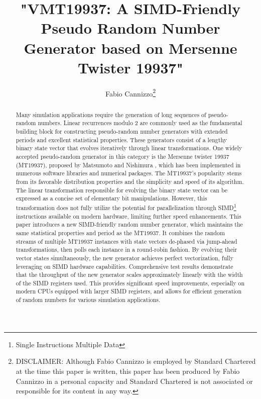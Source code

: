\documentclass[preprint,1p,times]{elsarticle}
\begin{document}

\newcommand\XOR{\mathbin{\oplus}}
\newcommand\OR{\mid}
\newcommand\AND{\&}
\newcommand\myceil[1]{\left\lceil{#1}\right\rceil}



\begin{frontmatter}
\title{"VMT19937: A SIMD-Friendly Pseudo Random Number Generator based on Mersenne Twister 19937"}

\author{\renewcommand*{\thefootnote}{\fnsymbol{footnote}}
	Fabio Cannizzo\footnote{DISCLAIMER: Although Fabio Cannizzo is employed by Standard Chartered at the time this paper is written, this paper has been produced by Fabio Cannizzo in a personal capacity and Standard Chartered is not associated or responsible for its content in any way.}}

\begin{abstract}
Many simulation applications require the generation of long sequences of pseudo-random numbers. Linear recurrences modulo 2 are commonly used as the fundamental building block for constructing pseudo-random number generators with extended periods and excellent statistical properties. These generators consist of a lengthy binary state vector that evolves iteratively through linear transformations. One widely accepted pseudo-random generator in this category is the Mersenne twister 19937 (MT19937), proposed by Matsumoto and Nishimura \cite{mt19937}, which has been implemented in numerous software libraries and numerical packages. The MT19937's popularity stems from its favorable distribution properties and the simplicity and speed of its algorithm. The linear transformation responsible for evolving the binary state vector can be expressed as a concise set of elementary bit manipulations. However, this transformation does not fully utilize the potential for parallelization through SIMD\footnote{Single Instructions Multiple Data} instructions available on modern hardware, limiting further speed enhancements.
This paper introduces a new SIMD-friendly random number generator, which maintains the same statistical properties and period as the MT19937. It combines the random streams of multiple MT19937 instances with state vectors de-phased via jump-ahead transformations, then polls each instance in a round-robin fashion. By evolving their vector states simultaneously, the new generator achieves perfect vectorization, fully leveraging on SIMD hardware capabilities. Comprehensive test results demonstrate that the throughput of the new generator scales approximately linearly with the width of the SIMD registers used. This provides significant speed improvements, especially on modern CPUs equipped with larger SIMD registers, and allows for efficient generation of random numbers for various simulation applications.
\end{abstract}


\end{frontmatter}
\end{document}
